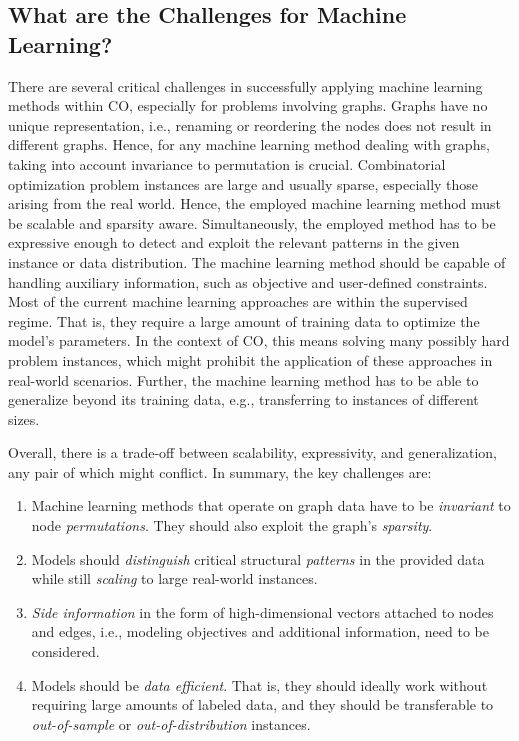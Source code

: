 \documentclass[twoside,11pt]{article}
\begin{document}
\subsection{What are the Challenges for Machine Learning?}
There are several critical challenges in successfully applying machine learning methods within CO, especially for problems involving graphs. Graphs have no unique representation, i.e., renaming or reordering the nodes does not result in different graphs. Hence, for any machine learning method dealing with graphs, taking into account invariance to permutation is crucial. Combinatorial optimization problem instances are large and usually sparse, especially those arising from the real world. Hence, the employed machine learning method must be scalable and sparsity aware. Simultaneously, the employed method has to be expressive enough to detect and exploit the relevant patterns in the given instance or data distribution. The machine learning method should be capable of handling auxiliary information, such as objective and user-defined constraints.
Most of the current machine learning approaches are within the supervised regime. That is, they require a large amount of training data to optimize the model's parameters. In the context of CO, this means solving many possibly hard problem instances, which might prohibit the application of these approaches in real-world scenarios. Further, the machine learning method has to be able to generalize beyond its training data, e.g., transferring to instances of different sizes.

Overall, there is a trade-off between scalability, expressivity, and generalization, any pair of which might conflict. In summary, the key challenges are:
\begin{enumerate}
	\item Machine learning methods that operate on graph data have to be \emph{invariant} to node \emph{permutations}. They should also exploit the graph's \emph{sparsity}.
	\item Models should \emph{distinguish} critical structural \emph{patterns} in the provided data while still \emph{scaling} to large real-world instances.
	\item \emph{Side information} in the form of high-dimensional vectors attached to nodes and edges, i.e., modeling objectives and additional information, need to be considered.
	\item Models should be \emph{data efficient}. That is, they should ideally work without requiring large amounts of labeled data, and they should be transferable to \emph{out-of-sample} or \emph{out-of-distribution} instances.
\end{enumerate}
\end{document}
